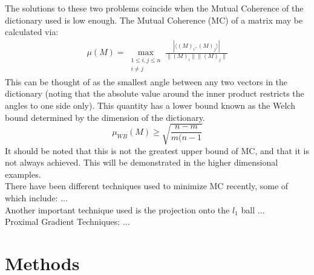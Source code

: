 \documentclass[journal]{IEEEtran}
\begin{document}
The solutions to these two problems coincide when the Mutual Coherence of the dictionary used is low 
enough. The Mutual Coherence (MC) of a matrix may be calculated via:
\begin{align}
\mu(M)=\max\limits_{\substack{1\leq i,j \leq n \\ i\neq j}}\frac{|\langle (M)_i, (M)_j \rangle |}{\|(M)_i\| \|(M)_j\|}
\end{align}
This can be thought of as the smallest angle between any two vectors in the dictionary (noting that
the absolute value around the inner product restricts the angles to one side only). This quantity
has a lower bound known as the Welch bound determined by the dimension of the dictionary.
\begin{equation}
\mu_{WB}(M) \geq \sqrt{\frac{n - m}{m(n-1}}
\end{equation}
It should be noted that this is not the greatest upper bound of MC, and that it is not always
achieved. This will be demonstrated in the higher dimensional examples. \\
There have been different techniques used to minimize MC recently, some of which include: $\ldots$ \\
Another important technique used is the projection onto the $l_1$ ball $\ldots$\\
Proximal Gradient Techniques: $\ldots$
\pagebreak %
\section{Methods}
\end{document}
